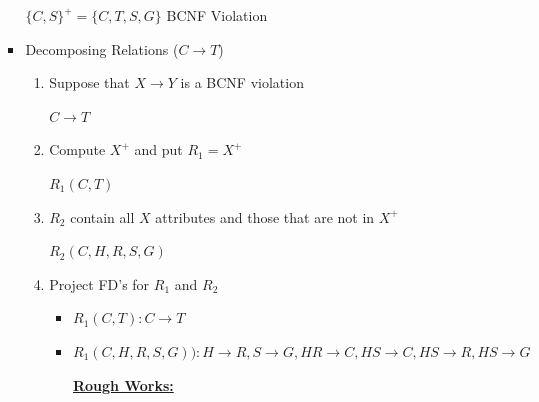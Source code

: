\documentclass[12pt]{article}
\begin{document}
\begin{enumerate}[1.]
\begin{enumerate}[a)]
\begin{itemize}
            \bigskip

            $\{C,S\}^+ = \{C,T,S,G\}$ \color{red} BCNF Violation\color{black}

            \item Decomposing Relations ($C \to T$)

            \begin{enumerate}[1.]
                \item Suppose that $X \to Y$ is a BCNF violation

                \bigskip

                \color{red}$C \to T$\color{black}

                \bigskip

                \item Compute $X^+$ and put $R_1 = X^+$

                \bigskip

                \color{red}$R_1(C,T)$\color{black}

                \bigskip

                \item $R_2$ contain all $X$ attributes and those that are not in $X^+$

                \bigskip

                \color{red}$R_2(C,H,R,S,G)$\color{black}

                \bigskip

                \item Project FD's for $R_1$ and $R_2$

                \bigskip

                \begin{itemize}
                    \item $R_1(C,T): C \to T$
                    \item $R_1(C,H,R,S,G)): H \to R,S \to G,HR \to C,HS \to C,HS \to R,HS \to G$

                    \bigskip

                    \begin{mdframed}
                        \underline{\textbf{Rough Works:}}

                        \bigskip


\end{mdframed}
\end{itemize}
\end{enumerate}
\end{itemize}
\end{enumerate}
\end{enumerate}
\end{document}

